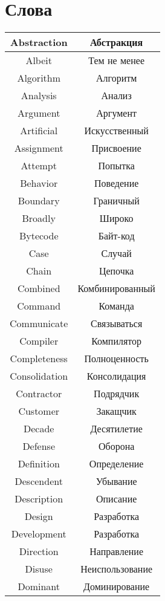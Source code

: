 \newpage
\chapter*{Слова}

\begin{table}[h!]
  \centering
  \begin{tabular}{|*{2}{C{.4}|}} \hline
    Abstraction & Абстракция \\ \hline
    Albeit & Тем не менее \\ \hline
    Algorithm & Алгоритм \\ \hline
    Analysis & Анализ \\ \hline
    Argument & Аргумент \\ \hline
    Artificial & Искусственный \\ \hline
    Assignment & Присвоение \\ \hline
    Attempt & Попытка \\ \hline
    Behavior & Поведение \\ \hline
    Boundary & Граничный \\ \hline
    Broadly & Широко \\ \hline
    Bytecode & Байт-код \\ \hline
    Case & Случай \\ \hline
    Chain & Цепочка \\ \hline
    Combined & Комбинированный \\ \hline
    Command & Команда \\ \hline
    Communicate & Связываться \\ \hline
    Compiler & Компилятор \\ \hline
    Completeness & Полноценность \\ \hline
    Consolidation & Консолидация \\ \hline
    Contractor & Подрядчик \\ \hline
    Customer & Закащчик \\ \hline
    Decade & Десятилетие \\ \hline
    Defense & Оборона \\ \hline
    Definition & Определение \\ \hline
    Descendent & Убывание \\ \hline
    Description & Описание \\ \hline
    Design & Разработка \\ \hline
    Development & Разработка \\ \hline
    Direction & Направление \\ \hline
    Disuse & Неиспользование\\ \hline
    Dominant & Доминирование \\ \hline
  \end{tabular}
\end{table}

